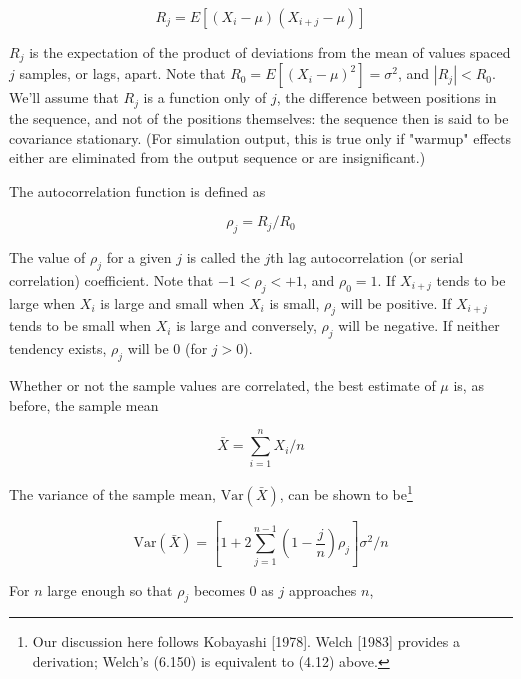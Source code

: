 \begin{equation}
R_j = E[(X_i - \mu)(X_{i+j} - \mu)]
\label{eq:output-autocovariance}
\end{equation}

$R_j$ is the expectation of the product of deviations from the mean of values
spaced $j$ samples, or lags, apart. Note that $R_0 = E[(X_i - \mu)^2] =
\sigma^2$, and
\noindent $|R_j| < R_0$. We'll assume that $R_j$ is a function only of
$j$, the difference between positions in the sequence, and not of the
positions themselves: the sequence then is said to be covariance stationary.
(For simulation output, this is true only if "warmup" effects either are
eliminated from the output sequence or are insignificant.)

The autocorrelation function is defined as

\begin{equation}
\rho_j = R_j / R_0
\label{eq:output-autocorrelation}
\end{equation}

The value of $\rho_j$ for a given $j$ is called the $j$th lag autocorrelation
(or serial correlation) coefficient. Note that $-1 < \rho_j < +1$, and
$\rho_0 = 1$. If $X_{i+j}$ tends to be large when $X_i$ is large and small when
$X_i$ is small, $\rho_j$ will be positive. If $X_{i+j}$ tends to be small when
$X_i$ is large and conversely, $\rho_j$ will be negative. If neither tendency
exists, $\rho_j$ will be 0 (for $j > 0$).

Whether or not the sample values are correlated, the best estimate of $\mu$ is,
as before, the sample mean

\begin{equation}
\bar{X} = \sum_{i=1}^{n} X_i / n
\label{eq:output-mean-x}
\end{equation}

The variance of the sample mean, $\mathrm{Var}(\bar{X})$, can be shown to be\footnote{Our discussion here follows Kobayashi [1978]. Welch [1983] provides a derivation; Welch's (6.150) is equivalent to (4.12) above.}

\begin{equation}
\mathrm{Var}(\bar{X}) =
\left[1 + 2 \sum_{j=1}^{n-1} \left(1 - \frac{j}{n}\right) \rho_j \right]
\sigma^2 / n
\label{eq:output-variance-mean}
\end{equation}

For $n$ large enough so that $\rho_j$ becomes 0 as $j$ approaches $n$,

